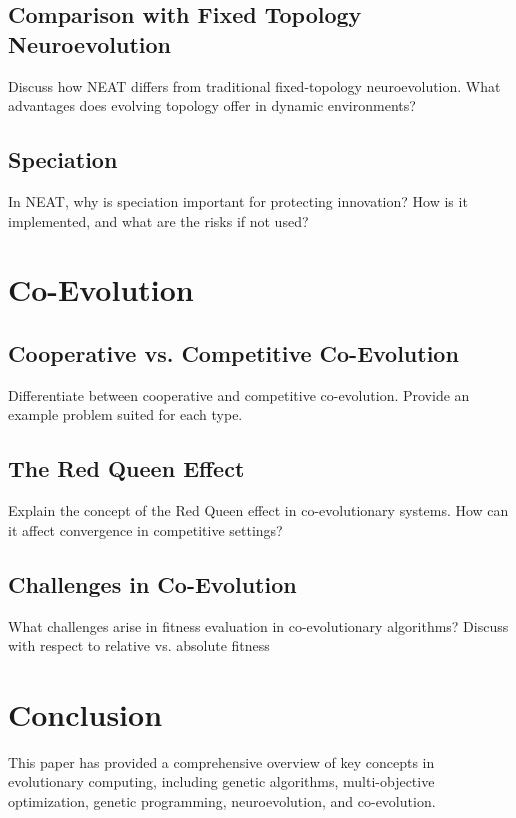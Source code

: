 \documentclass[journal,12pt,onecolumn]{IEEEtran}
\begin{document}
\subsection{Comparison with Fixed Topology Neuroevolution}

Discuss how NEAT differs from traditional fixed-topology neuroevolution. What advantages does evolving topology offer in dynamic environments?

\subsection{Speciation}

In NEAT, why is speciation important for protecting innovation? How is it implemented, and what are the risks if not used?


\section{Co-Evolution}

\subsection{Cooperative vs. Competitive Co-Evolution}
Differentiate between cooperative and competitive co-evolution. Provide an example problem suited for each type.

\subsection{The Red Queen Effect}
Explain the concept of the Red Queen effect in co-evolutionary systems. How can it affect convergence in competitive settings?

\subsection{Challenges in Co-Evolution}
What challenges arise in fitness evaluation in co-evolutionary algorithms? Discuss with respect to relative vs. absolute fitness



\section{Conclusion}

This paper has provided a comprehensive overview of key concepts in evolutionary computing, including genetic algorithms, multi-objective optimization, genetic programming, neuroevolution, and co-evolution.
\end{document}
